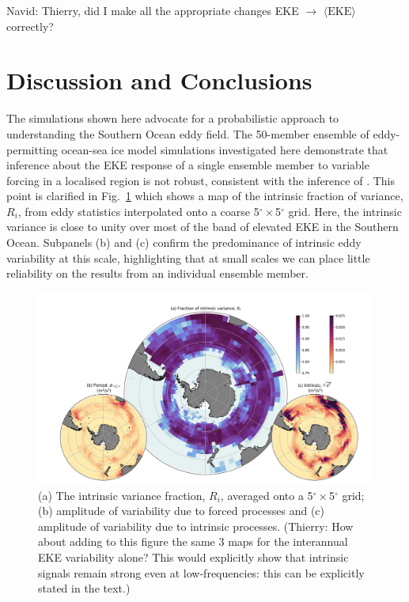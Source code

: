 \documentclass{agujournal2019}
\begin{document}
{\color{red}Navid: Thierry, did I make all the appropriate changes EKE $\to$ $\langle\textrm{EKE}\rangle$ correctly?}

\section{Discussion and Conclusions}
The simulations shown here advocate for a probabilistic approach to understanding the Southern Ocean eddy field.
The 50-member ensemble of eddy-permitting ocean-sea ice model simulations investigated here demonstrate that inference about the EKE response of a single ensemble member to variable forcing in a localised region is not robust, consistent with the inference of \citet{Zhang2021}.
This point is clarified in Fig.~\ref{Fig:6} which shows a map of the intrinsic fraction of variance, $R_i$, from eddy statistics interpolated onto a coarse 5$^\circ \times$5$^\circ$ grid.
Here, the intrinsic variance is close to unity over most of the band of elevated EKE in the Southern Ocean. 
Subpanels (b) and (c) confirm the predominance of intrinsic eddy variability at this scale, highlighting that at small scales we can place little reliability on the results from an individual ensemble member.

\begin{figure}[t]
\begin{center}
\includegraphics[width=\hsize]{Figure6}
\caption{(a) The intrinsic variance fraction, $R_i$, averaged onto a  5$^\circ \times$5$^\circ$ grid; (b) amplitude of variability due to forced processes and (c) amplitude of variability due to intrinsic processes. {\color{red}(Thierry: How about adding to this figure the same 3 maps for the interannual EKE variability alone? This would explicitly show that intrinsic signals remain strong even at low-frequencies: this can be explicitly stated in the text.)}}
\label{Fig:6}
\end{center}
\end{figure}
\end{document}
